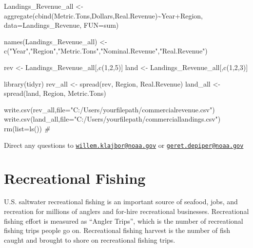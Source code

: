 \documentclass[
]{book}
\newenvironment{Shaded}{\begin{snugshade}}{\end{snugshade}}
\newcommand{\AttributeTok}[1]{\textcolor[rgb]{0.77,0.63,0.00}{#1}}
\newcommand{\CommentTok}[1]{\textcolor[rgb]{0.56,0.35,0.01}{\textit{#1}}}
\newcommand{\DecValTok}[1]{\textcolor[rgb]{0.00,0.00,0.81}{#1}}
\newcommand{\FunctionTok}[1]{\textcolor[rgb]{0.00,0.00,0.00}{#1}}
\newcommand{\NormalTok}[1]{#1}
\newcommand{\OtherTok}[1]{\textcolor[rgb]{0.56,0.35,0.01}{#1}}
\newcommand{\SpecialCharTok}[1]{\textcolor[rgb]{0.00,0.00,0.00}{#1}}
\newcommand{\StringTok}[1]{\textcolor[rgb]{0.31,0.60,0.02}{#1}}
\begin{document}
\begin{Shaded}
\begin{Highlighting}[]
\NormalTok{Landings\_Revenue\_all }\OtherTok{\textless{}{-}} \FunctionTok{aggregate}\NormalTok{(}\FunctionTok{cbind}\NormalTok{(Metric.Tons,Dollars,Real.Revenue)}\SpecialCharTok{\textasciitilde{}}\NormalTok{Year}\SpecialCharTok{+}\NormalTok{Region, }\AttributeTok{data=}\NormalTok{Landings\_Revenue, }\AttributeTok{FUN=}\NormalTok{sum)}

\FunctionTok{names}\NormalTok{(Landings\_Revenue\_all) }\OtherTok{\textless{}{-}} \FunctionTok{c}\NormalTok{(}\StringTok{"Year"}\NormalTok{,}\StringTok{"Region"}\NormalTok{,}\StringTok{"Metric.Tons"}\NormalTok{,}\StringTok{"Nominal.Revenue"}\NormalTok{,}\StringTok{"Real.Revenue"}\NormalTok{)}

\NormalTok{rev }\OtherTok{\textless{}{-}}\NormalTok{ Landings\_Revenue\_all[,}\FunctionTok{c}\NormalTok{(}\DecValTok{1}\NormalTok{,}\DecValTok{2}\NormalTok{,}\DecValTok{5}\NormalTok{)]}
\NormalTok{land }\OtherTok{\textless{}{-}}\NormalTok{ Landings\_Revenue\_all[,}\FunctionTok{c}\NormalTok{(}\DecValTok{1}\NormalTok{,}\DecValTok{2}\NormalTok{,}\DecValTok{3}\NormalTok{)]}

\FunctionTok{library}\NormalTok{(tidyr)}
\NormalTok{rev\_all }\OtherTok{\textless{}{-}} \FunctionTok{spread}\NormalTok{(rev, Region, Real.Revenue)}
\NormalTok{land\_all }\OtherTok{\textless{}{-}} \FunctionTok{spread}\NormalTok{(land, Region, Metric.Tons)}

\FunctionTok{write.csv}\NormalTok{(rev\_all,}\AttributeTok{file=}\StringTok{"C:/Users/yourfilepath/commercialrevenue.csv"}\NormalTok{)}
\FunctionTok{write.csv}\NormalTok{(land\_all,}\AttributeTok{file=}\StringTok{"C:/Users/yourfilepath/commerciallandings.csv"}\NormalTok{)}
\FunctionTok{rm}\NormalTok{(}\AttributeTok{list=}\FunctionTok{ls}\NormalTok{())}
\CommentTok{\#}
\end{Highlighting}
\end{Shaded}

Direct any questions to \href{mailto:willem.klajbor@noaa.gov}{\nolinkurl{willem.klajbor@noaa.gov}} or \href{mailto:geret.depiper@noaa.gov}{\nolinkurl{geret.depiper@noaa.gov}}

\hypertarget{recreational-fishing}{%
\chapter{Recreational Fishing}\label{recreational-fishing}}

U.S. saltwater recreational fishing is an important source of seafood, jobs, and recreation for millions of anglers and for-hire recreational businesses. Recreational fishing effort is measured as ``Angler Trips'', which is the number of recreational fishing trips people go on. Recreational fishing harvest is the number of fish caught and brought to shore on recreational fishing trips.
\end{document}
